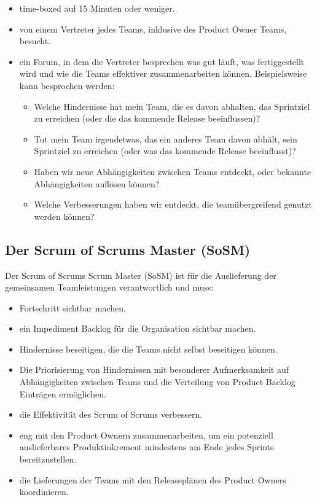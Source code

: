 \documentclass[12pt,a4paper,parskip=full]{scrartcl}
\begin{document}
\begin{itemize}
\item time-boxed auf 15 Minuten oder weniger.
\item von einem Vertreter jedes Teams, inklusive des Product Owner Teams, besucht.
\item ein Forum, in dem die Vertreter besprechen was gut läuft, was fertiggestellt wird und wie die Teams effektiver zusammenarbeiten können. Beispielsweise kann besprochen werden:
\begin{itemize}
\item Welche Hindernisse hat mein Team, die es davon abhalten, das Sprintziel zu erreichen (oder die das kommende Release beeinflussen)?
\item Tut mein Team irgendetwas, das ein anderes Team davon abhält, sein Sprintziel zu erreichen (oder was das kommende Release beeinflusst)?
\item Haben wir neue Abhängigkeiten zwischen Teams entdeckt, oder bekannte Abhängigkeiten auflösen können?
\item Welche Verbesserungen haben wir entdeckt, die teamübergreifend genutzt werden können?
\end{itemize}
\end{itemize}

\subsection{Der Scrum of Scrums Master (SoSM)}
Der Scrum of Scrums Scrum Master (SoSM) ist für die Auslieferung der gemeinsamen Teamleistungen verantwortlich und muss:
\begin{itemize}
\item Fortschritt sichtbar machen.
\item ein Impediment Backlog für die Organisation sichtbar machen.
\item Hindernisse beseitigen, die die Teams nicht selbst beseitigen können.
\item Die Priorisierung von Hindernissen mit besonderer Aufmerksamkeit auf Abhängigkeiten zwischen Teams und die Verteilung von Product Backlog Einträgen ermöglichen.
\item die Effektivität des Scrum of Scrums verbessern.
\item eng mit den Product Ownern zusammenarbeiten, um ein potenziell auslieferbares Produktinkrement mindestens am Ende jedes Sprints bereitzustellen.
\item die Lieferungen der Teams mit den Releaseplänen des Product Owners koordinieren.
\end{itemize}
\end{document}
